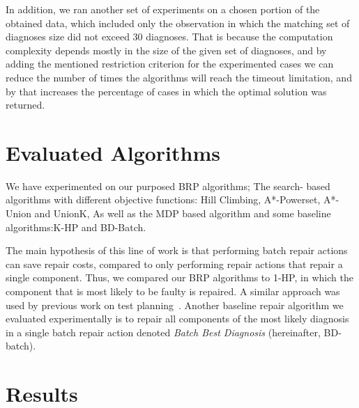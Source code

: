 \documentclass[a4paper,11pt]{report}
\newcommand\roni[1]{\textcolor{green}{roni: #1}}
\begin{document}
In addition, we ran another set of experiments on a chosen portion of the obtained data, which included only the observation in which the matching set of diagnoses size did not exceed 30 diagnoses. That is because the computation complexity depends mostly in the size of the given set of diagnoses, and by adding the mentioned restriction criterion for the experimented cases we can reduce the number of times the algorithms will reach the timeout limitation, and by that increases the percentage of cases in which the optimal solution was returned. 

\section{Evaluated Algorithms}

We have experimented on our purposed BRP algorithms; The search- based algorithms with different objective functions: Hill Climbing, A*-Powerset, A*-Union and UnionK, As well as the MDP based algorithm and some baseline algorithms:K-HP and BD-Batch. 

The main hypothesis of this line of work is that performing batch repair actions can save repair costs, compared to only performing repair actions that repair a single component. Thus, we compared our BRP algorithms to 1-HP, in which the component that is most likely to be faulty is repaired. A similar approach was used by previous work on test planning~\cite{zamir2014using}. Another baseline repair algorithm we evaluated experimentally is to repair all components of the most likely diagnosis in a single batch repair action denoted {\em Batch Best Diagnosis} (hereinafter, BD-batch).

\section{Results}
\end{document}
